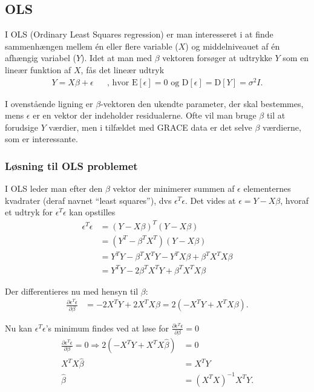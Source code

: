 \subsection{OLS}
I OLS (Ordinary Least Squares regression) er man interesseret i at finde sammenhængen mellem én eller flere variable ($X$) og middelniveauet af én afhængig variabel ($Y$).
Idet at man med $\beta$ vektoren forsøger at udtrykke $Y$ som en lineær funktion af $X$, fås det lineær udtryk
\begin{align}
Y=X \beta +\epsilon && \text{, hvor } \mathrm{E}[\epsilon] = 0 \text{ og } \mathrm{D}[\epsilon] = \mathrm{D}[Y] = \sigma^2 I .
\end{align}

I ovenstående ligning er $\beta$-vektoren den ukendte parameter, der skal bestemmes, mens $\epsilon$ er en vektor der indeholder residualerne.
Ofte vil man bruge $\beta$ til at forudsige $Y$ værdier, men i tilfældet med GRACE data er det selve $\beta$ værdierne, som er interessante.

\subsubsection{Løsning til OLS problemet}
I OLS leder man efter den $\beta$ vektor der minimerer summen af $\epsilon$ elementernes kvadrater (deraf navnet ``least squares''), dvs $\epsilon^T \epsilon$.
Det vides at $\epsilon = Y - X \beta$, hvoraf et udtryk for $\epsilon^T \epsilon$ kan opstilles
\begin{equation}
\begin{split}
\epsilon^T\epsilon&=(Y-X\beta)^T (Y-X\beta)\\
&=(Y^T-\beta^T X^T) (Y-X\beta) \\
&=Y^T Y-\beta^T X^T Y-Y^T X \beta + \beta^T X^T X \beta \\
&=Y^T Y- 2\beta^T X^T Y+ \beta^T X^T X \beta
\end{split}
\end{equation}

Der differentieres nu med hensyn til $\beta$:
\begin{equation}
\begin{split}
\frac{\partial \epsilon^T\epsilon}{\partial \beta}&=-2 X^T Y+2X^T X \beta=2(-X^T Y+X^T X \beta).
\end{split}
\end{equation}

Nu kan $\epsilon^T \epsilon$'s minimum findes ved at løse for $\frac{\partial \epsilon^T\epsilon}{\partial \beta} = 0$
\begin{equation}
\begin{split}
\frac{\partial \epsilon^T\epsilon}{\partial \beta} = 0 \Rightarrow 2(-X^T Y+X^T X \hat{\beta}) &= 0 \\
X^T X \hat{\beta}&=X^T Y \\
\hat{\beta}&=(X^T X)^{-1} X^T Y.
\end{split}
\end{equation}

